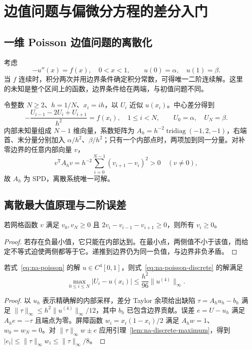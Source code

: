 \setcounter{chapter}{10} %
\chapter{边值问题与偏微分方程的差分入门}
\label{chap:na-pde}

\section{一维 Poisson 边值问题的离散化}
考虑
\begin{equation}
 -u''(x)=f(x),\quad 0<x<1,\qquad u(0)=\alpha,\quad u(1)=\beta.
 \label{eq:na-poisson}
\end{equation}
当 $f$ 连续时，积分两次并用边界条件确定积分常数，可得唯一二阶连续解。这里的未知是整个区间上的函数，边界条件给在两端，与初值问题不同。

令整数 $N\ge2$、$h=1/N$、$x_i=ih$，以 $U_i$ 近似 $u(x_i)$。中心差分得到
\begin{equation}
 -\frac{U_{i-1}-2U_i+U_{i+1}}{h^2}=f(x_i),\quad1\le i<N,
 \qquad U_0=\alpha,\quad U_N=\beta.
 \label{eq:na-poisson-discrete}
\end{equation}
内部未知量组成 $N-1$ 维向量，系数矩阵为 $A_h=h^{-2}\operatorname{tridiag}(-1,2,-1)$，右端首、末分量分别加入 $\alpha/h^2$、$\beta/h^2$；只有一个内部点时，两项加到同一分量。对补零边界的任意内部向量 $v$，
\[
 v^{\mathsf T}A_hv=h^{-2}\sum_{i=0}^{N-1}(v_{i+1}-v_i)^2>0\quad(v\ne0),
\]
故 $A_h$ 为 SPD，离散系统唯一可解。

\section{离散最大值原理与二阶误差}
\begin{lemma}[离散比较原理]
\label{lem:na-discrete-maximum}
若网格函数 $v$ 满足 $v_0,v_N\ge0$ 且 $2v_i-v_{i-1}-v_{i+1}\ge0$，则所有 $v_i\ge0$。
\end{lemma}
\begin{proof}
若存在负最小值，它只能在内部达到。在最小点，两侧值不小于该值，而给定不等式迫使两侧都等于它。递推到边界仍为同一负值，与边界非负矛盾。
\end{proof}

\begin{theorem}
若式~\eqref{eq:na-poisson} 的解 $u\in C^4[0,1]$，则式~\eqref{eq:na-poisson-discrete} 的解满足
\[
 \max_{0\le i\le N}|U_i-u(x_i)|\le\frac{h^2}{96}\|u^{(4)}\|_\infty.
\]
\end{theorem}
\begin{proof}
以 $u_h$ 表示精确解的内部采样，差分 Taylor 余项给出缺陷 $\tau=A_hu_h-b_h$ 满足 $\|\tau\|_\infty\le h^2\|u^{(4)}\|_\infty/12$，其中 $b_h$ 已包含边界贡献。误差 $e=U-u_h$ 满足 $A_he=-\tau$ 且端点为零。屏障函数 $w_i=x_i(1-x_i)/2$ 满足 $A_hw=1$、$w_0=w_N=0$。对 $\|\tau\|_\infty w\pm e$ 应用引理~\ref{lem:na-discrete-maximum}，得到 $|e_i|\le\|\tau\|_\infty w_i\le\|\tau\|_\infty/8$。
\end{proof}


